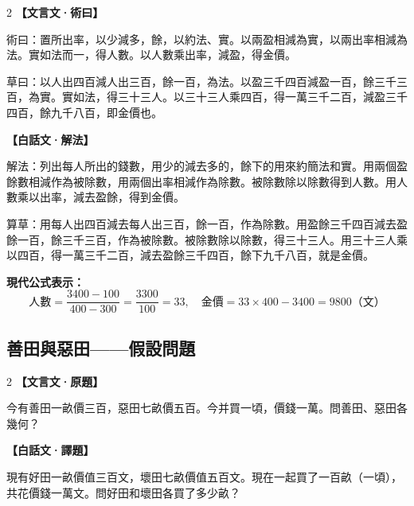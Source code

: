 \documentclass[11pt,a4paper]{article}
\newcommand{\zhc}{}[1]{{\CJKfamily{\CJKrmdefault}#1}}  %
\newcommand{\zhm}[1]{{\CJKfamily{\CJKrmdefault}#1}}  %
\newenvironment{prob bilingual}[1][]{%
  \begin{paracol}{2}%
  \setlength{\columnseprule}{0.4pt}%
}{%
  \end{paracol}%
  \medskip%
}
\begin{document}
\begin{paracol}{2}
\switchcolumn[0]
\noindent\textbf{\textcolor{notecolor}{\zhc{【文言文·術曰】}}}\par\smallskip
\zhc{
術曰：置所出率，以少減多，餘，以約法、實。以兩盈相減為實，以兩出率相減為法。實如法而一，得人數。以人數乘出率，減盈，得金價。

草曰：以人出四百減人出三百，餘一百，為法。以盈三千四百減盈一百，餘三千三百，為實。實如法，得三十三人。以三十三人乘四百，得一萬三千二百，減盈三千四百，餘九千八百，即金價也。
}

\switchcolumn[1]
\noindent\textbf{\textcolor{notecolor}{\zhm{【白話文·解法】}}}\par\smallskip
\zhm{
解法：列出每人所出的錢數，用少的減去多的，餘下的用來約簡法和實。用兩個盈餘數相減作為被除數，用兩個出率相減作為除數。被除數除以除數得到人數。用人數乘以出率，減去盈餘，得到金價。

算草：用每人出四百減去每人出三百，餘一百，作為除數。用盈餘三千四百減去盈餘一百，餘三千三百，作為被除數。被除數除以除數，得三十三人。用三十三人乘以四百，得一萬三千二百，減去盈餘三千四百，餘下九千八百，就是金價。
}
\end{paracol}

\medskip

\noindent\textbf{\textcolor{sectioncolor}{\zhc{現代公式表示：}}}
\[
\text{人數} = \frac{3400 - 100}{400 - 300} = \frac{3300}{100} = 33, \quad
\text{金價} = 33 \times 400 - 3400 = 9800 \text{（文）}
\]

\vspace{0.5cm}

\subsection{\zhc{善田與惡田——假設問題}}

\begin{paracol}{2}
\switchcolumn[0]
\noindent\textbf{\textcolor{notecolor}{\zhc{【文言文·原題】}}}\par\smallskip
\zhc{
今有善田一畝價三百，惡田七畝價五百。今并買一頃，價錢一萬。問善田、惡田各幾何？
}

\switchcolumn[1]
\noindent\textbf{\textcolor{notecolor}{\zhm{【白話文·譯題】}}}\par\smallskip
\zhm{
現有好田一畝價值三百文，壞田七畝價值五百文。現在一起買了一百畝（一頃），共花價錢一萬文。問好田和壞田各買了多少畝？
}
\end{paracol}

\medskip
\end{document}
